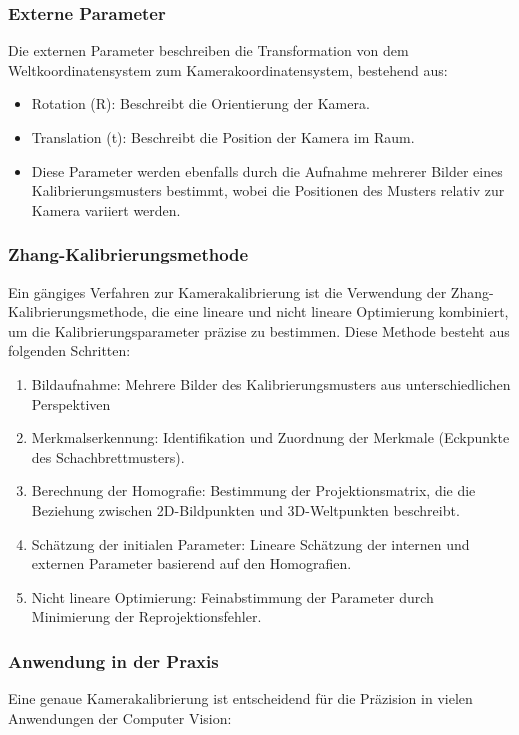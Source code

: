 {    \subsubsection{Externe Parameter}

Die externen Parameter beschreiben die Transformation von dem Weltkoordinatensystem zum Kamerakoordinatensystem, bestehend aus:
        
  \begin{itemize}
    \item Rotation (R): Beschreibt die Orientierung der Kamera.
    \item Translation (t): Beschreibt die Position der Kamera im Raum.
    \item Diese Parameter werden ebenfalls durch die Aufnahme mehrerer Bilder eines Kalibrierungsmusters bestimmt, wobei die Positionen des Musters relativ zur Kamera variiert werden.
  \end{itemize}        

    
    \subsubsection{Zhang-Kalibrierungsmethode}
    
    {Ein gängiges Verfahren zur Kamerakalibrierung ist die Verwendung der Zhang-Kalibrierungsmethode, die eine lineare und nicht lineare Optimierung kombiniert, um die Kalibrierungsparameter präzise zu bestimmen. Diese Methode besteht aus folgenden Schritten:
    }
    
    \begin{enumerate}
        \item Bildaufnahme: Mehrere Bilder des Kalibrierungsmusters aus unterschiedlichen Perspektiven
        \item Merkmalserkennung: Identifikation und Zuordnung der Merkmale (Eckpunkte des Schachbrettmusters).
        \item Berechnung der Homografie: Bestimmung der Projektionsmatrix, die die Beziehung zwischen 2D-Bildpunkten und 3D-Weltpunkten beschreibt.
        \item Schätzung der initialen Parameter: Lineare Schätzung der internen und externen Parameter basierend auf den Homografien.
        \item Nicht lineare Optimierung: Feinabstimmung der Parameter durch Minimierung der Reprojektionsfehler.
    \end{enumerate}
    
    
    \subsubsection{Anwendung in der Praxis}
    Eine genaue Kamerakalibrierung ist entscheidend für die Präzision in vielen Anwendungen der Computer Vision:
    
}
